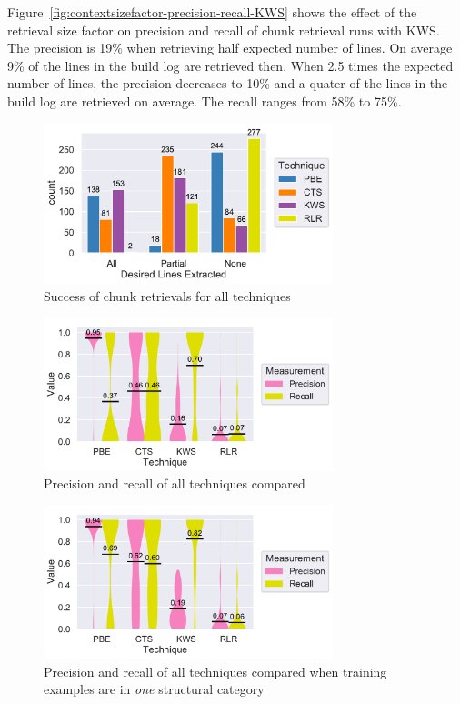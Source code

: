 \documentclass[\myrootdir/main.tex]{subfiles}
\begin{document}
Figure~\ref{fig:contextsizefactor-precision-recall-KWS} shows the effect of the retrieval size factor on precision and recall of chunk retrieval runs with KWS\@.
The precision is 19\% when retrieving half expected number of lines. On average 9\% of the lines in the build log are retrieved then.
When 2.5 times the expected number of lines, the precision decreases to 10\% and a quater of the lines in the build log are retrieved on average.
The recall ranges from 58\% to 75\%.

\begin{figure}[htbp]
		\centering
		\includegraphics[width=0.75\textwidth, clip]{img/big-study/success-partial-all.pdf}
		\caption{Success of chunk retrievals for all techniques}
		\label{fig:success-partial-all}
\end{figure}

\begin{figure}[htbp]
		\centering
		\includegraphics[width=0.75\textwidth, clip]{img/big-study/recall-precision-all.pdf}
		\caption{Precision and recall of all techniques compared}
		\label{fig:recall-precision-all}
\end{figure}

\begin{figure}[htbp]
	\centering
		\includegraphics[width=0.75\textwidth, clip]{img/big-study/recall-precision-singlecategory-all.pdf}
		\caption{Precision and recall of all techniques compared when training examples are in \emph{one} structural category}
		\label{fig:recall-precision-singlecategory-all}
\end{figure}
\end{document}
